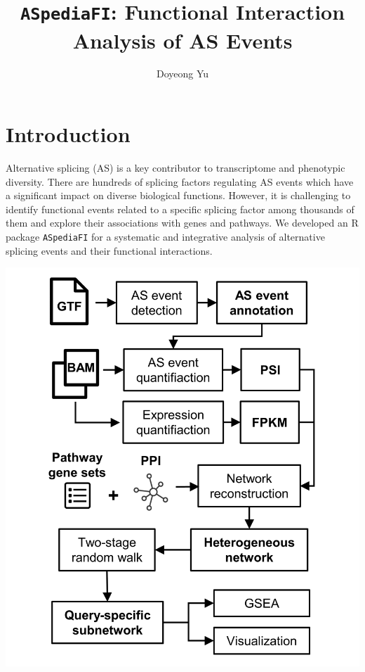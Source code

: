 \documentclass{article}\usepackage[]{graphicx}\usepackage[]{color}
\begin{document}
\title{\texttt{ASpediaFI}: Functional Interaction Analysis of AS Events}

\author[1]{Doyeong Yu}


\date{}
\maketitle
\tableofcontents
\pagebreak
\section{Introduction}
Alternative splicing (AS) is a key contributor to transcriptome and phenotypic
diversity. There are hundreds of splicing factors regulating
AS events which have a significant impact on diverse biological functions.
However, it is challenging to identify functional events related to a specific
splicing factor among thousands of them and explore their
associations with genes and pathways. We developed an R package
\texttt{ASpediaFI} for a systematic and integrative analysis of
alternative splicing events and their functional interactions.

\begin{center}
\includegraphics{Figure1.png}
\end{center}
\end{document}
